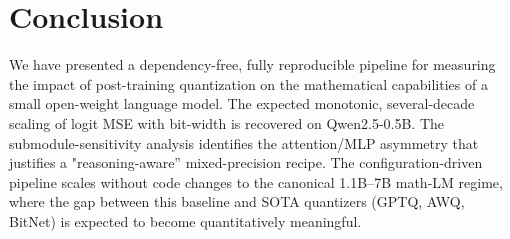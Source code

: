 \section{Conclusion}
We have presented a dependency-free, fully reproducible pipeline for
measuring the impact of post-training quantization on the mathematical
capabilities of a small open-weight language model. The expected
monotonic, several-decade scaling of logit MSE with bit-width is recovered
on Qwen2.5-0.5B. The submodule-sensitivity analysis identifies the
attention/MLP asymmetry that justifies a "reasoning-aware'' mixed-precision
recipe. The configuration-driven pipeline scales without code changes to
the canonical 1.1B--7B math-LM regime, where the gap between this baseline
and SOTA quantizers (GPTQ, AWQ, BitNet) is expected to become quantitatively
meaningful.
